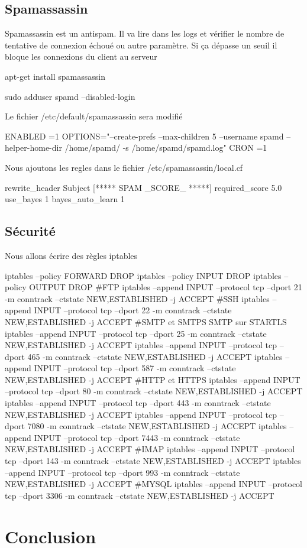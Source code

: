\documentclass[a4paper,12pt,french]{report} %
\begin{document}
\section{Spamassassin}
Spamassassin est un antispam. Il va lire dans les logs et vérifier le nombre de tentative de connexion échoué ou autre paramètre. Si ça dépasse un seuil il bloque les connexions du client au serveur
\begin{exempleConsole}
apt-get install spamassassin
\end{exempleConsole}
\begin{exempleConsole}
sudo adduser spamd --disabled-login
\end{exempleConsole}
Le fichier /etc/default/spamassassin sera modifié
\begin{exempleConsole}
ENABLED =1
OPTIONS="--create-prefs --max-children 5 --username spamd --helper-home-dir /home/spamd/ -s /home/spamd/spamd.log"
CRON =1
\end{exempleConsole}
Nous ajoutons les regles dans le fichier /etc/spamassassin/local.cf
\begin{exempleConsole}
rewrite_header Subject [***** SPAM _SCORE_ *****]
required_score 5.0
use_bayes 1
bayes_auto_learn 1
\end{exempleConsole}
\section{ Sécurité}
Nous allons écrire des règles iptables 
\begin{exempleConsole}
iptables --policy FORWARD DROP
iptables --policy INPUT  DROP
iptables --policy OUTPUT  DROP
#FTP
iptables --append INPUT --protocol tcp --dport 21 -m conntrack --ctstate NEW,ESTABLISHED -j ACCEPT
#SSH
iptables --append INPUT --protocol tcp --dport 22 -m conntrack --ctstate NEW,ESTABLISHED -j ACCEPT
#SMTP et SMTPS SMTP sur STARTLS
iptables --append INPUT --protocol tcp --dport 25 -m conntrack --ctstate NEW,ESTABLISHED -j ACCEPT
iptables --append INPUT --protocol tcp --dport 465 -m conntrack --ctstate NEW,ESTABLISHED -j ACCEPT
iptables --append INPUT --protocol tcp --dport 587 -m conntrack --ctstate NEW,ESTABLISHED -j ACCEPT
#HTTP et HTTPS
iptables --append INPUT --protocol tcp --dport 80 -m conntrack --ctstate NEW,ESTABLISHED -j ACCEPT
iptables --append INPUT --protocol tcp --dport 443 -m conntrack --ctstate NEW,ESTABLISHED -j ACCEPT
iptables --append INPUT --protocol tcp --dport 7080 -m conntrack --ctstate NEW,ESTABLISHED -j ACCEPT
iptables --append INPUT --protocol tcp --dport 7443 -m conntrack --ctstate NEW,ESTABLISHED -j ACCEPT
#IMAP
iptables --append INPUT --protocol tcp --dport 143 -m conntrack --ctstate NEW,ESTABLISHED -j ACCEPT
iptables --append INPUT --protocol tcp --dport 993 -m conntrack --ctstate NEW,ESTABLISHED -j ACCEPT
#MYSQL
iptables --append INPUT --protocol tcp --dport 3306 -m conntrack --ctstate NEW,ESTABLISHED -j ACCEPT

\end{exempleConsole}
\chapter*{Conclusion}
%
\end{document}
